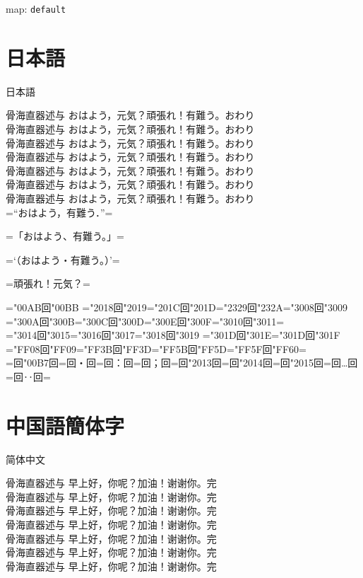 \documentclass{ujarticle}
\def\map{default}
\begin{document}
\parindent0mm
map: \texttt{\map}

\section{日本語}
\upjpngtb 日本語

\upjpnrml 骨海直器述与 おはよう，元気？頑張れ！有難う。おわり\\
\upjpnrmm 骨海直器述与 おはよう，元気？頑張れ！有難う。おわり\\
\upjpnrmb 骨海直器述与 おはよう，元気？頑張れ！有難う。おわり\\
\upjpngtm 骨海直器述与 おはよう，元気？頑張れ！有難う。おわり\\
\upjpngtb 骨海直器述与 おはよう，元気？頑張れ！有難う。おわり\\
\upjpngte 骨海直器述与 おはよう，元気？頑張れ！有難う。おわり\\
\upjpngth 骨海直器述与 おはよう，元気？頑張れ！有難う。おわり\\

\upjpnrmm
=“おはよう，有難う．”=

=「おはよう、有難う。」=

=‘（おはよう・有難う。）’=

=頑張れ！元気？=

=\kchar"00AB回\kchar"00BB%
=\kchar"2018回\kchar"2019=\kchar"201C回\kchar"201D=\kchar"2329回\kchar"232A=\kchar"3008回\kchar"3009%
=\kchar"300A回\kchar"300B=\kchar"300C回\kchar"300D=\kchar"300E回\kchar"300F=\kchar"3010回\kchar"3011=\\
=\kchar"3014回\kchar"3015=\kchar"3016回\kchar"3017=\kchar"3018回\kchar"3019%
=\kchar"301D回\kchar"301E=\kchar"301D回\kchar"301F%
=\kchar"FF08回\kchar"FF09=\kchar"FF3B回\kchar"FF3D=\kchar"FF5B回\kchar"FF5D=\kchar"FF5F回\kchar"FF60=\\
=回\kchar"00B7回=回・回=回：回=回；回=回\kchar"2013回=回\kchar"2014回=回\kchar"2015回=回…回=回‥回=


\section{中国語簡体字}
\upschgtb 简体中文

\upschrml 骨海直器述与 早上好，你呢？加油！谢谢你。完\\
\upschrmm 骨海直器述与 早上好，你呢？加油！谢谢你。完\\
\upschrmb 骨海直器述与 早上好，你呢？加油！谢谢你。完\\
\upschgtm 骨海直器述与 早上好，你呢？加油！谢谢你。完\\
\upschgtb 骨海直器述与 早上好，你呢？加油！谢谢你。完\\
\upschgte 骨海直器述与 早上好，你呢？加油！谢谢你。完\\
\upschgth 骨海直器述与 早上好，你呢？加油！谢谢你。完\\
\end{document}
